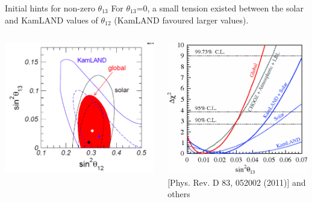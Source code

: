 \begin{frame}{Initial hints for non-zero $\theta_{13}$}
\centering
For $\theta_{13}$=0, a small tension existed between the solar and
KamLAND values of $\theta_{12}$ (KamLAND favoured larger values).
\begin{columns}
  \begin{column}{0.50\textwidth}
     \includegraphics[width=0.99\textwidth]{./images/3nu/reactor/kamLAND_theta13_contour_v2.png}
  \end{column}
  \begin{column}{0.50\textwidth}
     \includegraphics[width=0.99\textwidth]{./images/3nu/reactor/kamLAND_theta13_projection.png}\\
     {\scriptsize \color{blue}[Phys. Rev. D 83, 052002 (2011)] and others}
  \end{column}
\end{columns}
\end{frame}

